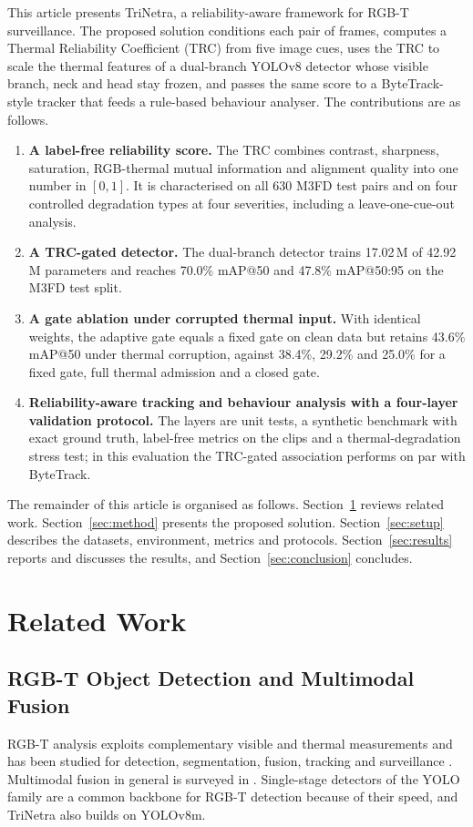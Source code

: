 \documentclass[journal]{IEEEtran}
\begin{document}
This article presents TriNetra, a reliability-aware framework for RGB-T surveillance. The proposed solution conditions each pair of frames, computes a Thermal Reliability Coefficient (TRC) from five image cues, uses the TRC to scale the thermal features of a dual-branch YOLOv8 detector \cite{yolov8} whose visible branch, neck and head stay frozen, and passes the same score to a ByteTrack-style tracker \cite{bytetrack} that feeds a rule-based behaviour analyser. The contributions are as follows.
\begin{enumerate}
\item \textbf{A label-free reliability score.} The TRC combines contrast, sharpness, saturation, RGB-thermal mutual information and alignment quality into one number in $[0,1]$. It is characterised on all 630 M3FD test pairs and on four controlled degradation types at four severities, including a leave-one-cue-out analysis.
\item \textbf{A TRC-gated detector.} The dual-branch detector trains 17.02\,M of 42.92\,M parameters and reaches 70.0\% mAP@50 and 47.8\% mAP@50:95 on the M3FD test split.
\item \textbf{A gate ablation under corrupted thermal input.} With identical weights, the adaptive gate equals a fixed gate on clean data but retains 43.6\% mAP@50 under thermal corruption, against 38.4\%, 29.2\% and 25.0\% for a fixed gate, full thermal admission and a closed gate.
\item \textbf{Reliability-aware tracking and behaviour analysis with a four-layer validation protocol.} The layers are unit tests, a synthetic benchmark with exact ground truth, label-free metrics on the clips and a thermal-degradation stress test; in this evaluation the TRC-gated association performs on par with ByteTrack.
\end{enumerate}

The remainder of this article is organised as follows. Section~\ref{sec:related} reviews related work. Section~\ref{sec:method} presents the proposed solution. Section~\ref{sec:setup} describes the datasets, environment, metrics and protocols. Section~\ref{sec:results} reports and discusses the results, and Section~\ref{sec:conclusion} concludes.

\section{Related Work}\label{sec:related}
\subsection{RGB-T Object Detection and Multimodal Fusion}
RGB-T analysis exploits complementary visible and thermal measurements and has been studied for detection, segmentation, fusion, tracking and surveillance \cite{songSurvey}. Multimodal fusion in general is surveyed in \cite{deepFusion}. Single-stage detectors of the YOLO family \cite{yolo,yolov8} are a common backbone for RGB-T detection because of their speed, and TriNetra also builds on YOLOv8m.
\end{document}
